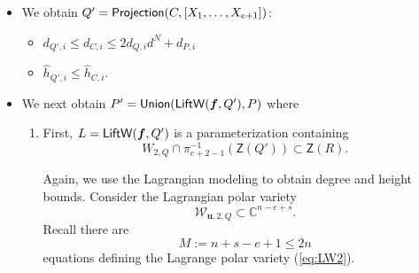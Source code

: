 \documentclass[12pt]{article}
\def\mA{{\bm A}}
\def\Zeroes{\mathsf{Z}}
\def\LiftWL{{\sf LiftW}}
\def\Union{{\sf Union}}
\def\Projection{{\sf Projection}}
\def\mA{{\bm A}}
\begin{document}
\begin{itemize}
\begin{enumerate}
\begin{enumerate}
\


Therefore after adding both respective degrees and heights we obtain:

\begin{itemize}
    \item $d_{C,i} \leq 2d_{Q,i}d^{N}$
    \item $\hat{h}_{C,i} \leq 2(\hat{h}_{Q,i}d^{N} + d_{Q,i} Nd^{N-1}((\log(N+1)d + H))$.
\end{itemize}



\end{enumerate}





\item Now we take the union $C = \Union(C,P)$:


\end{enumerate}


\begin{itemize}
    \item $d_{C,i} \leq 2d_{Q,i}d^{N} + d_{P,i}$
    \item $\hat{h}_{C,i} \leq 2\left(\hat{h}_{Q,i}d^{N} + d_{Q,i} Nd^{N-1}(\log(N+1)d + H)\right) \\+  (\hat{h}_{P,i}+n(12\log(2n+1)+h_{\mA})d_{P,i})$.
\end{itemize}
%






\item We obtain $Q' = \Projection(C, [X_1, \hdots , X_{e+1}])$:
%
%
\begin{itemize}
    \item $d_{Q',i} \leq d_{C,i} \leq 2d_{Q,i}d^{N} + d_{P,i}$
    \item $\hat{h}_{Q',i} \leq  \hat{h}_{C,i}$.
\end{itemize}
%



\item We next obtain $P' = \Union ( \LiftWL(\bm f, Q'),P)$ where 
\begin{enumerate}
    \item 
    
    First, $L = \LiftWL(\bm f, Q')$ is a parameterization containing 
        \[
        W_{2, Q} \cap \pi_{e+2-1}^{-1}(\Zeroes(Q')) \subset \Zeroes(R).
        \] 


Again, we use the Lagrangian modeling to obtain degree and height bounds. Consider the Lagrangian polar variety
%
\begin{equation}\label{eq:LW2}
\mathscr{W}_{\bm u,2,Q} \subset \mathbb{C}^{n-e+s}.
\end{equation}
%
Recall there are \[M:=n+s-e+1 \leq 2n\] equations defining the Lagrange polar variety (\ref{eq:LW2}). 
%


\end{enumerate}
\end{itemize}
\end{document}
